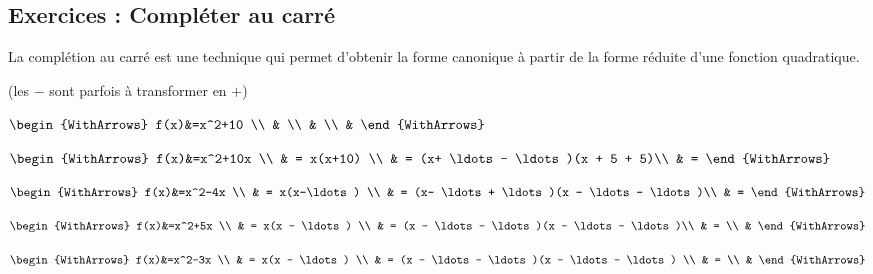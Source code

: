 \documentclass[main.tex]{subfiles}
\begin{document}
\newpage 
{}  
\pagestyle{scrheadings} %
\onehalfspacing
\subsection*{Exercices : Compléter au carré}
\begin{eBox}
	La complétion au carré est une technique qui permet d'obtenir la forme canonique à partir de la forme réduite d'une fonction quadratique.
\end{eBox}
\begin{example}[complétion au carré cas $a=1$](les $-$ sont parfois à transformer en $+$)\hfill
	
\noindent
\parbox{0.18\linewidth}{
	\noindent
	$\begin{WithArrows}
		f(x)&=x^2+10  \\
		&    \\
		&  \\
		&  
	\end{WithArrows}$
}\hfill
\parbox{0.35\linewidth}{
\noindent
$\begin{WithArrows}
 f(x)&=x^2+10x \\
 & = x(x+10) \\
 & = (x+ \ldots - \ldots)(x + 5 + 5)\\
 & = 
\end{WithArrows}$
}\hfill
\parbox{0.4\linewidth}{
	\noindent
	$\begin{WithArrows}
		f(x)&=x^2-4x \\
		& = x(x-\ldots) \\
		& = (x- \ldots + \ldots)(x - \ldots - \ldots)\\
		& = 
	\end{WithArrows}$
}	

\noindent
\parbox{0.45\linewidth}{
	\noindent
	$\begin{WithArrows}
		f(x)&=x^2+5x \\
		& = x(x - \ldots) \\
		& = (x - \ldots - \ldots)(x - \ldots - \ldots)\\
		& = \\
		&  
	\end{WithArrows}$
}	\hfill 
\parbox{0.45\linewidth}{
\noindent
$\begin{WithArrows}
	f(x)&=x^2-3x  \\
	& = x(x - \ldots)  \\
	& = (x - \ldots - \ldots)(x - \ldots - \ldots) \\
	& = \\
	&  
\end{WithArrows}$
} 


\end{example}
\end{document}
